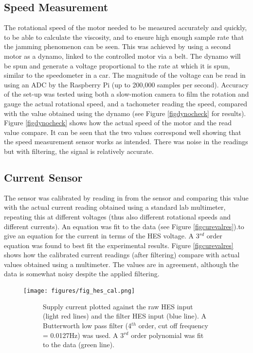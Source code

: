\documentclass[twoside,a4]{report}
\def\br{\newline \newline \noindent}
\begin{document}
	\subsection*{Speed Measurement} %
	The rotational speed of the motor needed to be measured accurately and quickly, to be able to calculate the viscosity, and to ensure high enough sample rate that the jamming phenomenon can be seen. This was achieved by using a second motor as a dynamo, linked to the controlled motor via a belt. The dynamo will be spun and generate a voltage proportional to the rate at which it is spun, similar to the speedometer in a car. The magnitude of the voltage can be read in using an ADC by the Raspberry Pi (up to 200,000 samples per second). Accuracy of the set-up was tested using both a slow-motion camera to film the rotation and gauge the actual rotational speed, and a tachometer reading the speed, compared with the value obtained using the dynamo (see Figure \ref{figdynocheck} for results). \br
	Figure \ref{figdynocheck} shows how the actual speed of the motor and the read value compare. It can be seen that the two values correspond well showing that the speed measurement sensor works as intended. There was noise in the readings but with filtering, the signal is relatively accurate.
	
	\subsection*{Current Sensor}
	The sensor was calibrated by reading in from the sensor and comparing this value with the actual current reading obtained using a standard lab multimeter, repeating this at different voltages (thus also different rotational speeds and different currents). An equation was fit to the data (see Figure \ref{figcurevalres}).to give an equation for the current in terms of the HES voltage. A 3$^{rd}$ order equation was found to best fit the experimental results.\br
	Figure \ref{figcurevalres} shows how the calibrated current readings (after filtering) compare with actual values obtained using a multimeter. The values are in agreement, although the data is somewhat noisy despite the applied filtering.
	
	\begin{figure}[!htb]
		\centering
		\texttt{[image: figures/fig\_hes\_cal.png]}
		\caption{Current Sensor Evaluation Results}
		\label{figcurevalres}
		\begin{subfigure}{0.9\textwidth}
			\footnotesize Supply current plotted against the raw HES input (light red lines) and the filter HES input (blue line). A Butterworth low pass filter (4$^{th}$ order, cut off frequency = 0.0127Hz) was used. A 3$^{rd}$ order polynomial was fit to the data (green line).
		\end{subfigure}
	\end{figure}
	
\end{document}
